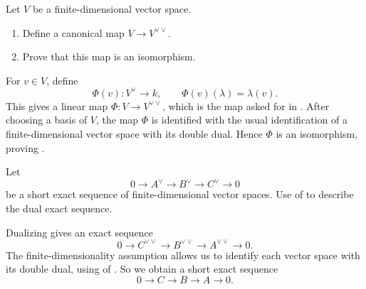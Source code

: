 


\showtodostrue

\makesheetheader

\begin{exercise}
    \label{exercise:basic}
    Let \(V\) be a finite-dimensional vector space.
    \begin{enumerate}
        \item Define a canonical map \(V \to V^{\vee\vee}\).
            \label{item:dual-dual-map}
        \item Prove that this map is an isomorphism.
            \label{item:dual-dual-isomorphism}
    \end{enumerate}
\end{exercise}

\showsolutionstrue
\begin{solution}
    For \(v \in V\), define
    \[
        \Phi(v) \colon V^\vee \to k,
        \qquad
        \Phi(v)(\lambda)=\lambda(v).
    \]
    This gives a linear map \(\Phi \colon V \to V^{\vee\vee}\), which is the map
    asked for in . After choosing a basis of \(V\), the
    map \(\Phi\) is identified with the usual identification of a finite-dimensional
    vector space with its double dual. Hence \(\Phi\) is an isomorphism, proving
    .
\end{solution}
\showsolutionsfalse

\begin{exercise}
    \label{exercise:exact-sequence}
    Let
    \[
        0 \to A^{\vee} \to B^{\vee} \to C^{\vee} \to 0
    \]
    be a short exact sequence of finite-dimensional vector spaces. Use
     of  to describe the
    dual exact sequence.
\end{exercise}

\begin{solution}
    Dualizing gives an exact sequence
    \[
        0 \to C^{\vee\vee} \to B^{\vee\vee} \to A^{\vee\vee} \to 0.
    \]
    The finite-dimensionality assumption allows us to identify each vector space
    with its double dual, using  of
    .
    So we obtain a short exact sequence
    \[
        0 \to C \to B \to A \to 0.
    \]
\end{solution}


